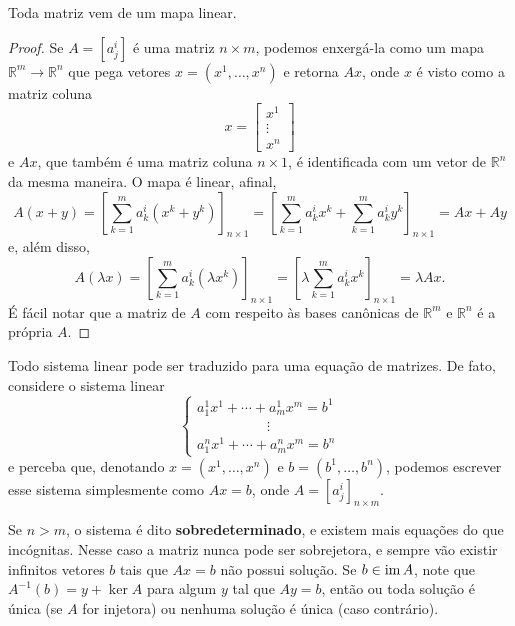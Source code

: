 \begin{proposition}
    Toda matriz vem de um mapa linear.
\end{proposition}
\begin{proof}
    Se $A = [a^i_j]$ é uma matriz $n \times m$, podemos enxergá-la como um mapa $\mathbb{R}^m \to \mathbb{R}^n$ que pega vetores $x = (x^1, \dots, x^n)$ e retorna $Ax$, onde $x$ é visto como a matriz coluna \begin{equation}
        x = \begin{bmatrix}
            x^1 \\ \vdots \\ x^n
        \end{bmatrix}
    \end{equation} e $Ax$, que também é uma matriz coluna $n \times 1$, é identificada com um vetor de $\mathbb{R}^n$ da mesma maneira. O mapa é linear, afinal, \begin{equation}
        A(x + y) = \left[\sum_{k = 1}^m a^i_k (x^k + y^k) \right]_{n \times 1} = \left[\sum_{k = 1}^m a^i_k x^k + \sum_{k = 1}^m a^i_k y^k \right]_{n \times 1} = Ax + Ay
    \end{equation} e, além disso, \begin{equation}
        A(\lambda x) = \left[\sum_{k = 1}^m a^i_k (\lambda x^k) \right]_{n \times 1} = \left[\lambda \sum_{k = 1}^m a^i_k x^k \right]_{n \times 1} = \lambda Ax.
    \end{equation} É fácil notar que a matriz de $A$ com respeito às bases canônicas de $\mathbb{R}^m$ e $\mathbb{R}^n$ é a própria $A$.
\end{proof}

Todo sistema linear pode ser traduzido para uma equação de matrizes. De fato, considere o sistema linear \begin{equation}
    \begin{cases}
        a^1_1 x^1 + \cdots + a^1_m x^m = b^1 \\ \quad \quad \quad \quad \quad \vdots \\ a^n_1 x^1 + \cdots + a^n_m x^m = b^n
    \end{cases}
\end{equation} e perceba que, denotando $x = (x^1, \dots, x^n)$ e $b = (b^1, \dots, b^n)$, podemos escrever esse sistema simplesmente como $Ax = b$, onde $A = [a^i_j]_{n \times m}$.

Se $n > m$, o sistema é dito \textbf{sobredeterminado}, e existem mais equações do que incógnitas. Nesse caso a matriz nunca pode ser sobrejetora, e sempre vão existir infinitos vetores $b$ tais que $Ax = b$ não possui solução. Se $b \in \operatorname{im} A$, note que $A^{-1}(b) = y + \ker A$ para algum $y$ tal que $Ay = b$, então ou toda solução é única (se $A$ for injetora) ou nenhuma solução é única (caso contrário).

